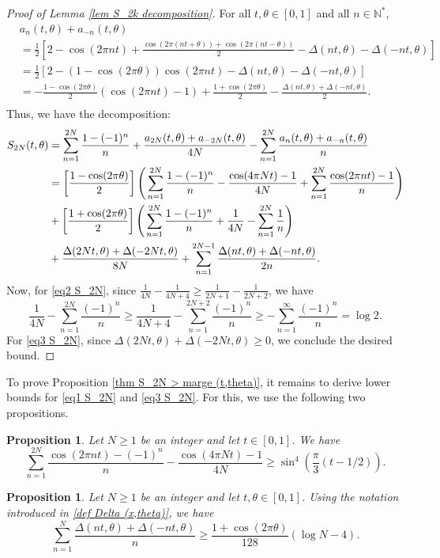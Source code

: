 \documentclass[12pt]{amsart}
\newtheorem{pro}[thm]{Proposition}
\theoremstyle{definition}
\numberwithin{equation}{section}
\numberwithin{equation}{section}
\begin{document}
\begin{proof}[Proof of Lemma \ref{lem S_2k decomposition}]
For all \(t,\theta \in [0,1]\) and all \(n \in \mathbb{N}^*\),
\begin{align*}
    &a_n(t,\theta)+a_{-n}(t,\theta) \\
    &= \frac{1}{2}\left[2-\cos(2\pi nt)+\frac{\cos(2\pi (nt+\theta))+\cos(2\pi (nt-\theta))}{2}
    -\Delta(nt,\theta) -\Delta(-nt,\theta)\right]\\
    &= \frac{1}{2}\left[2-(1-\cos(2\pi\theta))\cos(2\pi nt)
    -\Delta(nt,\theta) -\Delta(-nt,\theta)\right]\\
    &= -\frac{1-\cos(2\pi\theta)}{2}(\cos(2\pi nt)-1)+\frac{1+\cos(2\pi \theta)}{2}
    -\frac{\Delta(nt,\theta) +\Delta(-nt,\theta)}{2}.\\
\end{align*}
Thus, we have the decomposition:
\begin{align}
    S_{2N}(t,\theta)
    &=\sum_{n=1}^{2N} \frac{1-(-1)^n}{n}
    +\frac{a_{2N}(t,\theta)+a_{-2N}(t,\theta)}{4N}-\sum_{n=1}^{2N}
     \frac{a_n(t,\theta)+a_{-n}(t,\theta)}{n} \notag 
    \\
    \label{eq1 S_2N}
    &=\left[\frac{1-\cos(2\pi \theta)}{2}\right]\Bigg(\sum_{n=1}^{2N}\frac{1-(-1)^n}{n}-\frac{\cos(4\pi Nt)-1}{4N}
    +\sum_{n=1}^{2N}\frac{\cos(2\pi nt)-1}{n}\Bigg) 
    \\
    \label{eq2 S_2N}
    &+ \left[\frac{1+\cos(2\pi \theta)}{2}\right]
    \Bigg(\sum_{n=1}^{2N}\frac{1-(-1)^n}{n}+\frac{1}{4N}-
    \sum_{n=1}^{2N}\frac{1}{n}\Bigg) 
    \\
    &+\frac{\Delta(2Nt,\theta) +\Delta(-2Nt,\theta)}{8N}+\sum_{n=1}^{2N-1}
    \frac{\Delta(nt,\theta) +\Delta(-nt,\theta)}{2n}.
    \label{eq3 S_2N}
\end{align}
Now, for \eqref{eq2 S_2N}, since $ \frac{1}{4N}-\frac{1}{4N+4}\geq \frac{1}{2N+1}-\frac{1}{2N+2}$, we have
\[
    \frac{1}{4N}-
    \sum_{n=1}^{2N}\frac{(-1)^n}{n}
\geq
    \frac{1}{4N+4}-
    \sum_{n=1}^{2N+2}\frac{(-1)^n}{n}
\geq  
-\sum_{n=1}^{\infty}\frac{(-1)^n}{n} =
    \log 2 .
\] 
For \eqref{eq3 S_2N}, since $\Delta(2Nt,\theta) +\Delta(-2Nt,\theta)\geq 0$, we conclude the desired bound.
\end{proof}

To prove Proposition \ref{thm S_2N > marge (t,theta)}, it remains to derive lower bounds for \eqref{eq1 S_2N} and \eqref{eq3 S_2N}. For this, we use the following two propositions.
\begin{pro}\label{pro > sin^4}
Let \(N\geq1\) be an integer and let \(t\in[0,1]\). We have
    \[\sum_{n=1}^{2N} \frac{\cos(2\pi nt)-(-1)^n}{n} - \frac{\cos(4\pi N t)-1}{4N}
    \geq \sin^4\left(\frac{\pi}{3}(t-1/2)\right).\]
\end{pro}
\begin{pro}\label{pro Delta(ht)> C}
Let \(N\geq1\) be an integer and let \(t,\theta\in[0,1]\). Using the notation introduced in \eqref{def Delta (x,theta)}, we have
\[
\sum_{n=1}^N\frac{\Delta(nt,\theta)+\Delta(-nt,\theta)}{n}
\geq \frac{1+\cos(2\pi\theta)}{128}(\log N -4).\]
\end{pro}
\end{document}
